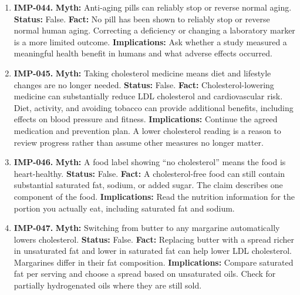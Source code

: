 \documentclass[11pt,oneside]{book}
\begin{document}
\begin{enumerate}[leftmargin=0pt,labelwidth=0pt,labelsep=0pt,itemindent=0pt]
\item[] \textbf{IMP-044.} \textbf{Myth:} Anti-aging pills can reliably stop or reverse normal aging.\newline
\textbf{Status:} False.\newline
\textbf{Fact:} No pill has been shown to reliably stop or reverse normal human aging. Correcting a deficiency or changing a laboratory marker is a more limited outcome. \cite{ref266}\newline
\textbf{Implications:} Ask whether a study measured a meaningful health benefit in humans and what adverse effects occurred.
\item[] \textbf{IMP-045.} \textbf{Myth:} Taking cholesterol medicine means diet and lifestyle changes are no longer needed.\newline
\textbf{Status:} False.\newline
\textbf{Fact:} Cholesterol-lowering medicine can substantially reduce LDL cholesterol and cardiovascular risk. Diet, activity, and avoiding tobacco can provide additional benefits, including effects on blood pressure and fitness. \cite{ref46}\newline
\textbf{Implications:} Continue the agreed medication and prevention plan. A lower cholesterol reading is a reason to review progress rather than assume other measures no longer matter.
\item[] \textbf{IMP-046.} \textbf{Myth:} A food label showing ``no cholesterol'' means the food is heart-healthy.\newline
\textbf{Status:} False.\newline
\textbf{Fact:} A cholesterol-free food can still contain substantial saturated fat, sodium, or added sugar. The claim describes one component of the food. \cite{ref10}\newline
\textbf{Implications:} Read the nutrition information for the portion you actually eat, including saturated fat and sodium.
\item[] \textbf{IMP-047.} \textbf{Myth:} Switching from butter to any margarine automatically lowers cholesterol.\newline
\textbf{Status:} False.\newline
\textbf{Fact:} Replacing butter with a spread richer in unsaturated fat and lower in saturated fat can help lower LDL cholesterol. Margarines differ in their fat composition. \cite{ref10}\newline
\textbf{Implications:} Compare saturated fat per serving and choose a spread based on unsaturated oils. Check for partially hydrogenated oils where they are still sold.

\end{enumerate}
\end{document}
